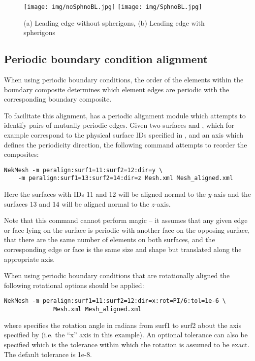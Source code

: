 \begin{figure}[!htbp]
  \begin{center}
    \texttt{[image: img/noSphnoBL.jpg]}
    \texttt{[image: img/SphnoBL.jpg]}
    \caption{(a) Leading edge without spherigons, (b) Leading edge with
      spherigons}
  \end{center}
\end{figure}

\subsection{Periodic boundary condition alignment}

When using periodic boundary conditions, the order of the elements within the
boundary composite determines which element edges are periodic with the
corresponding boundary composite.

To facilitate this alignment, \nm has a periodic alignment module
which attempts to identify pairs of mutually periodic edges. Given two
surfaces  and , which for example correspond
to the physical surface IDs specified in \gmsh, and an axis which
defines the periodicity direction, the following command attempts to
reorder the composites:
%
\begin{lstlisting}[style=BashInputStyle]
NekMesh -m peralign:surf1=11:surf2=12:dir=y \
    -m peralign:surf1=13:surf2=14:dir=z Mesh.xml Mesh_aligned.xml
\end{lstlisting}
%
Here the surfaces with IDs 11 and 12 will be aligned normal to the $y$-axis and
the surfaces 13 and 14 will be aligned normal to the $z$-axis.

Note that this command cannot perform magic -- it assumes that any given edge or
face lying on the surface is periodic with another face on the opposing surface,
that there are the same number of elements on both surfaces, and the
corresponding edge or face is the same size and shape but translated along the
appropriate axis.


When using periodic boundary conditions that are rotationally aligned the following rotational options should be applied:
%
\begin{lstlisting}[style=BashInputStyle]
NekMesh -m peralign:surf1=11:surf2=12:dir=x:rot=PI/6:tol=1e-6 \
              Mesh.xml Mesh_aligned.xml
\end{lstlisting}
%
where  specifies the rotation angle in radians from
surf1 to surf2 about the axis specified by  (i.e. the ``x'' axis in
this example). An optional tolerance \inltt{tol} can also be specified which is
the tolerance within which the rotation is assumed to be exact. The
default tolerance is 1e-8.

